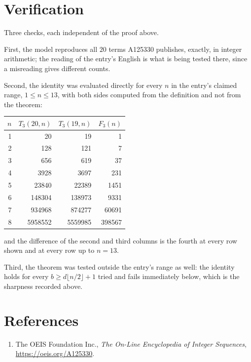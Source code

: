 \documentclass[11pt,a4paper]{article}
\theoremstyle{plain}
\theoremstyle{definition}
\begin{document}
\section{Verification}

Three checks, each independent of the proof above.

First, the model reproduces all $20$ terms A125330 publishes, exactly, in integer
arithmetic; the reading of the entry's English is what is being tested there, since a
misreading gives different counts.

Second, the identity was evaluated directly for every $n$ in the entry's claimed range,
$1\le n\le13$, with both sides computed from the definition and not from the theorem:

\begin{center}
\begin{tabular}{rrrr}
$n$ & $T_{3}(20,n)$ & $T_{3}(19,n)$ & $F_{3}(n)$ \\ \hline
1 & 20 & 19 & 1 \\
2 & 128 & 121 & 7 \\
3 & 656 & 619 & 37 \\
4 & 3928 & 3697 & 231 \\
5 & 23840 & 22389 & 1451 \\
6 & 148304 & 138973 & 9331 \\
7 & 934968 & 874277 & 60691 \\
8 & 5958552 & 5559985 & 398567 \\
\end{tabular}
\end{center}

\noindent and the difference of the second and third columns is the fourth at every row shown
and at every row up to $n=13$.

Third, the theorem was tested outside the entry's range as well: the identity holds for every
$b\ge d\lfloor n/2\rfloor+1$ tried and fails immediately below, which is the sharpness recorded
above.

\section*{References}
\begin{enumerate}
\item The OEIS Foundation Inc., \emph{The On-Line Encyclopedia of Integer Sequences},
\url{https://oeis.org/A125330}.
\end{enumerate}
\end{document}
